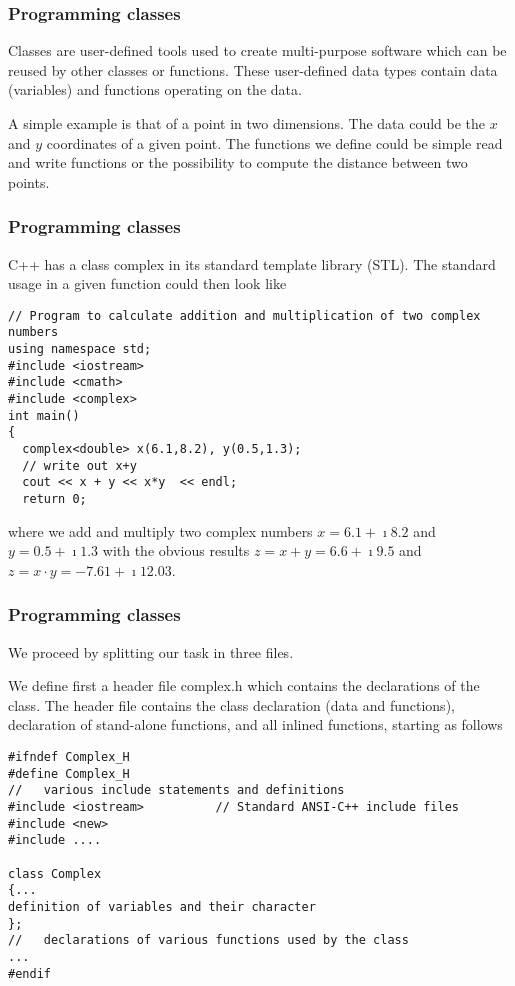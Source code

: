 \documentclass{beamer}
\begin{document}
\begin{frame}
\frametitle{Programming classes}

Classes are user-defined tools used to create multi-purpose software which can be reused by other classes or functions.
These user-defined data types contain data (variables) and
functions operating on the data.

A simple example is that of a point in two dimensions.
The data could be the $x$ and $y$ coordinates of a given  point. The functions
we define could be simple read and write functions or the possibility to compute the distance between two points.
\end{frame}

\begin{frame}
\frametitle{Programming classes}

C++ has a class complex in its standard
template library (STL). The standard usage in a given function could then look like

\begin{verbatim}
// Program to calculate addition and multiplication of two complex numbers
using namespace std;
#include <iostream>
#include <cmath>
#include <complex>
int main()
{
  complex<double> x(6.1,8.2), y(0.5,1.3);
  // write out x+y
  cout << x + y << x*y  << endl;
  return 0;

\end{verbatim}
where we add and multiply two complex numbers $x=6.1+\imath 8.2$ and $y=0.5+\imath 1.3$ with the obvious results
$z=x+y=6.6+\imath 9.5$ and $z=x\cdot y= -7.61+\imath 12.03$.
\end{frame}

\begin{frame}
\frametitle{Programming classes}

We proceed by  splitting our task in three files.

We define first a header file complex.h  which contains the declarations of
the class. The header file contains the class declaration (data and
functions), declaration of stand-alone functions, and all inlined
functions, starting as follows

\begin{verbatim}
#ifndef Complex_H
#define Complex_H
//   various include statements and definitions
#include <iostream>          // Standard ANSI-C++ include files
#include <new>
#include ....

class Complex
{...
definition of variables and their character
};
//   declarations of various functions used by the class
...
#endif
\end{verbatim}
\end{frame}
\end{document}
